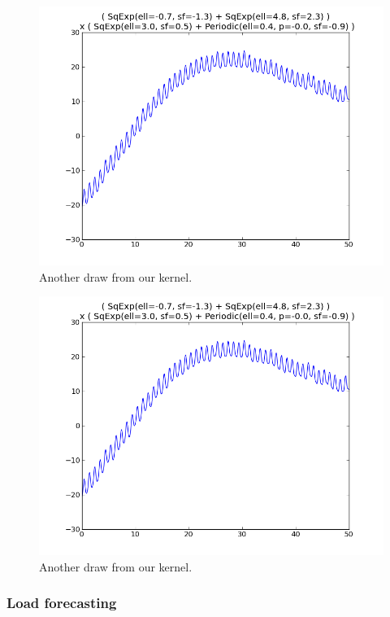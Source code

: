 \documentclass[twoside]{article}
\begin{document}
\begin{figure}[h]
\includegraphics[width=\columnwidth]{../figures/mauna_prior_draw_best_cov_v3}
\caption{Another draw from our kernel.}
\end{figure}

\begin{figure}[h]
\includegraphics[width=\columnwidth]{../figures/mauna_prior_draw_best_cov_v3}
\caption{Another draw from our kernel.}
\end{figure}

\subsubsection{Load forecasting}
\end{document}
